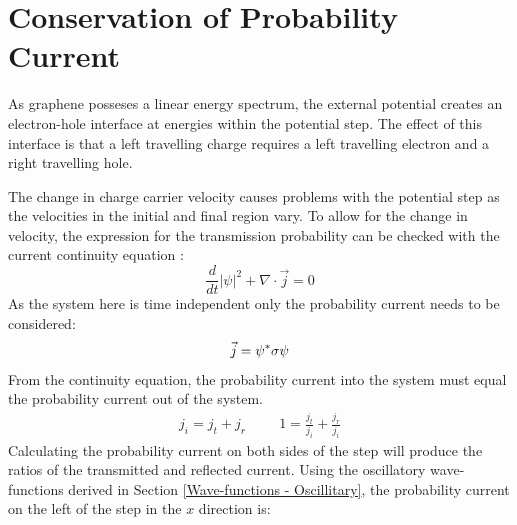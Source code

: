 		\section{Conservation of Probability Current}
		\label{Potential Step - Conservation of Probability Current}
			As graphene posseses a linear energy spectrum, the external potential creates an electron-hole interface at energies within the potential step. The effect of this interface is that a left travelling charge requires a left travelling electron and a right travelling hole.

			The change in charge carrier velocity causes problems with the potential step as the velocities in the initial and final region vary.  To allow for the change in velocity, the expression for the transmission probability can be checked with the current continuity equation \cite{b13, b40}:
		\begin{equation}
			\frac{d}{dt}|\psi|^{2}+\nabla\cdot \vec{j}=0
		\end{equation}
		As the system here is time independent only the probability current needs to be considered:
		\begin{equation}
			\vec{j} =\psi^{*} {\bf \sigma} \psi
		\end{equation}
		From the continuity equation, the probability current into the system must equal the probability current out of the system.
		\begin{align}
			j_{i}=j_{t}+j_{r}
			\hspace{1cm}
			1=\frac{j_{t}}{j_{i}}+\frac{j_{r}}{j_{i}}
		\end{align}
		Calculating the probability current on both sides of the step will produce the ratios of the transmitted and reflected current. Using the oscillatory wave-functions derived in Section \ref{Wave-functions - Oscillitary}, the probability current on the left of the step in the $x$ direction is:
